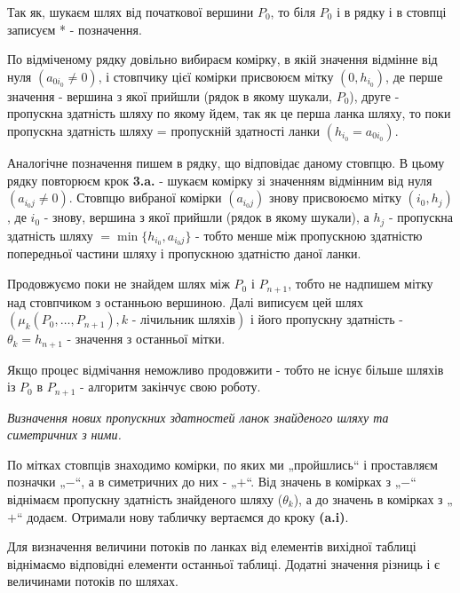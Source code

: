 \documentclass[12pt,a4paper]{book}
\newenvironment{slim_enumerate}{
\begin{enumerate}
  \setlength{\itemsep}{1pt}
  \setlength{\parskip}{0pt}
  \setlength{\parsep}{0pt}}
{\end{enumerate}}
\begin{document}
\begin{slim_enumerate}
\begin{slim_enumerate}
Так як, шукаєм шлях від початкової вершини $P_0$, то біля $P_0$ і в рядку і в стовпці записуєм * - позначення.
    \begin{slim_enumerate}
      \item По відміченому рядку довільно вибираєм комірку, в якій значення відмінне від нуля $(a_{0 i_0} \neq 0)$, і стовпчику цієї комірки присвоюєм мітку $(0, h_{i_0})$, де перше значення - вершина з якої прийшли (рядок в якому шукали, $P_0$), друге - пропускна здатність шляху по якому йдем, так як це перша ланка шляху, то поки пропускна здатність шляху = пропускній здатності ланки $(h_{i_0}=a_{0 i_0})$.
      \item Аналогічне позначення пишем в рядку, що відповідає даному стовпцю. В цьому рядку повторюєм крок {\bf 3.a.} - шукаєм комірку зі значенням відмінним від нуля $(a_{i_0 j} \neq 0)$. Стовпцю вибраної комірки $(a_{i_0 j})$ знову присвоюємо мітку $(i_0, h_j)$, де $i_0$ - знову, вершина з якої прийшли (рядок в якому шукали), а $h_j$ - пропускна здатність шляху $= \min \{h_{i_0}, a_{i_0 j}\}$ - тобто менше між пропускною здатністю попередньої частини шляху і пропускною здатністю даної ланки.
      \item Продовжуємо поки не знайдем шлях між $P_0$ і $P_{n+1}$, тобто не надпишем мітку над стовпчиком з останньою вершиною. Далі виписуєм цей шлях $(\mu_k(P_0, \dots , P_{n+1}), k \mbox{ - лічильник шляхів})$ і його пропускну здатність - $\theta_k=h_{n+1}$ - значення з останньої мітки.

Якщо процес відмічання неможливо продовжити - тобто не існує більше шляхів із $P_0$ в $P_{n+1}$ - алгоритм закінчує свою роботу.
    \end{slim_enumerate}
  \item {\it Визначення нових пропускних здатностей ланок знайденого шляху та симетричних з ними.}

По мітках стовпців знаходимо комірки, по яких ми „пройшлись“ і проставляєм позначки „$-$“, а в симетричних до них - „$+$“. Від значень в комірках з „$-$“ віднімаєм пропускну здатність знайденого шляху ($\theta_k$), а до значень в комірках з „$+$“ додаєм. Отримали нову табличку вертаємся до кроку {\bf (a.i)}.
  \end{slim_enumerate}
\end{slim_enumerate}

Для визначення величини потоків по ланках від елементів вихідної таблиці віднімаємо відповідні елементи останньої таблиці. Додатні значення різниць і є величинами потоків по шляхах.
\end{document}
